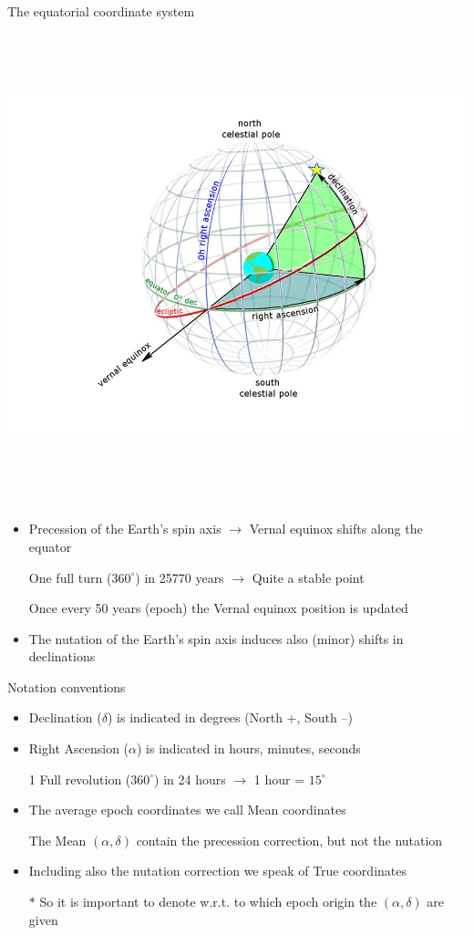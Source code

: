 \Tr
\onecolumn
\begin{center}
{\blue The equatorial coordinate system}\\[3mm]
\includegraphics[keepaspectratio,height=14cm]{ra-dec}
\end{center}

\Tr
\onecolumn
\begin{itemize}
\item Precession of the Earth's spin axis $\rightarrow$ Vernal equinox shifts along the equator
\item[] One full turn ($360^{\circ}$) in 25770 years $\rightarrow$ Quite a stable point
\item[] Once every 50 years (epoch) the Vernal equinox position is updated
\item The nutation of the Earth's spin axis induces also (minor) shifts in declinations
\end{itemize}
%
\begin{center}
{\red Notation conventions}
\end{center}
%
\begin{itemize}
\item {\blue Declination ($\delta$)} is indicated in degrees (North +, South --)
\item {\blue Right Ascension ($\alpha$)} is indicated in hours, minutes, seconds
\item[] 1 Full revolution ($360^{\circ}$) in 24 hours $\rightarrow$ 1 hour = $15^{\circ}$
\item The average epoch coordinates we call {\blue Mean coordinates}
\item[] The Mean $(\alpha,\delta)$ contain the precession correction, but not the nutation
\item Including also the nutation correction we speak of {\blue True coordinates}
\item[$\ast$] So it is important to denote w.r.t. to which epoch origin the $(\alpha,\delta)$ are given
\end{itemize}

